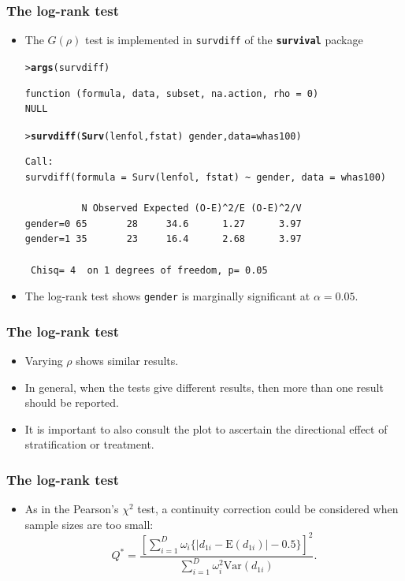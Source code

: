 \documentclass[10pt]{beamer}\usepackage[]{graphicx}\usepackage[]{color}
\makeatletter
\newcommand{\hlopt}[1]{\textcolor[rgb]{0,0,0}{#1}}%
\newcommand{\hlstd}[1]{\textcolor[rgb]{0.345,0.345,0.345}{#1}}%
\newcommand{\hlkwc}[1]{\textcolor[rgb]{0.333,0.667,0.333}{#1}}%
\newcommand{\hlkwd}[1]{\textcolor[rgb]{0.737,0.353,0.396}{\textbf{#1}}}%
\newenvironment{kframe}{%
 \def\at@end@of@kframe{}%
 \ifinner\ifhmode%
  \def\at@end@of@kframe{\end{minipage}}%
  \begin{minipage}{\columnwidth}%
 \fi\fi%
 \def\FrameCommand##1{\hskip\@totalleftmargin \hskip-\fboxsep
 \colorbox{shadecolor}{##1}\hskip-\fboxsep
     \hskip-\linewidth \hskip-\@totalleftmargin \hskip\columnwidth}%
 \MakeFramed {\advance\hsize-\width
   \@totalleftmargin\z@ \linewidth\hsize
   \@setminipage}}%
 {\par\unskip\endMakeFramed%
 \at@end@of@kframe}
\newenvironment{knitrout}{}{} %
\renewenvironment{knitrout}{\setlength{\topsep}{-.2mm}}{}
\newcommand{\pkg}[1]{{\textbf{\texttt{#1}}}}
\newcommand{\code}[1]{{\texttt{#1}}}
\newcommand{\Var}{\mathrm{Var}}
\newcommand{\E}{\mathrm{E}}
\makeatother
\begin{document}
\begin{frame}[fragile]
  \frametitle{The log-rank test}
  \begin{itemize}
  \item The $G(\rho)$ test is implemented in \code{survdiff} of the \pkg{survival} package
\begin{knitrout}\scriptsize
{}\color{fgcolor}\begin{kframe}
\begin{alltt}
\hlstd{> }\hlkwd{args}\hlstd{(survdiff)}
\end{alltt}
\begin{verbatim}
function (formula, data, subset, na.action, rho = 0) 
NULL
\end{verbatim}
\begin{alltt}
\hlstd{> }\hlkwd{survdiff}\hlstd{(}\hlkwd{Surv}\hlstd{(lenfol, fstat)} \hlopt{~} \hlstd{gender,} \hlkwc{data} \hlstd{= whas100)}
\end{alltt}
\begin{verbatim}
Call:
survdiff(formula = Surv(lenfol, fstat) ~ gender, data = whas100)

          N Observed Expected (O-E)^2/E (O-E)^2/V
gender=0 65       28     34.6      1.27      3.97
gender=1 35       23     16.4      2.68      3.97

 Chisq= 4  on 1 degrees of freedom, p= 0.05 
\end{verbatim}
\end{kframe}
\end{knitrout}
  \item The log-rank test shows \code{gender} is marginally significant at $\alpha = 0.05$.
  \end{itemize}
\end{frame}


\begin{frame}
  \frametitle{The log-rank test}
  \begin{itemize}
  \item Varying $\rho$ shows similar results.
  \item In general, when the tests give different results, then more than one result should be reported.
  \item It is important to also consult the plot to ascertain the directional effect of stratification or treatment.
  \end{itemize}
\end{frame}


\begin{frame}
  \frametitle{The log-rank test}
  \begin{itemize}
  \item As in the Pearson's $\chi^2$ test, a continuity correction could be considered when sample sizes are too small: 
    \begin{equation*}
      Q^*= \frac{\left[\sum_{i = 1}^D\omega_i\{|d_{1i} - \E(d_{1i})| - 0.5\}\right]^2}{\sum_{i = 1}^D\omega_i^2\Var(d_{1i})}.
      \end{equation*}
  \end{itemize}
\end{frame}
\end{document}
